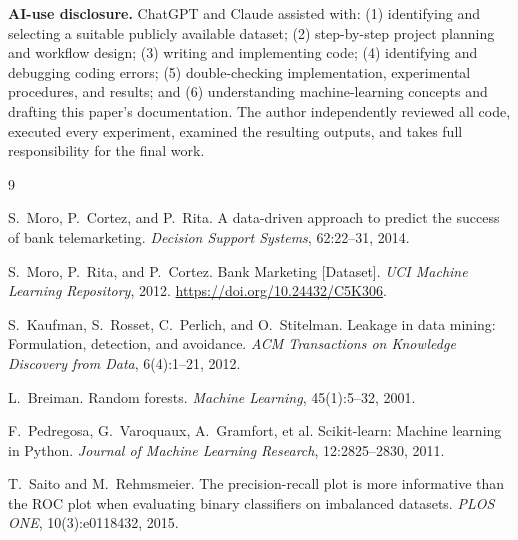 \documentclass{article}
\begin{document}
\textbf{AI-use disclosure.} ChatGPT and Claude assisted with: (1)
identifying and selecting a suitable publicly available dataset; (2)
step-by-step project planning and workflow design; (3) writing and
implementing code; (4) identifying and debugging coding errors; (5)
double-checking implementation, experimental procedures, and results; and
(6) understanding machine-learning concepts and drafting this paper's
documentation. The author independently reviewed all code, executed every
experiment, examined the resulting outputs, and takes full responsibility
for the final work.

\begin{thebibliography}{9}

S.~Moro, P.~Cortez, and P.~Rita.
\newblock A data-driven approach to predict the success of bank telemarketing.
\newblock \emph{Decision Support Systems}, 62:22--31, 2014.

S.~Moro, P.~Rita, and P.~Cortez.
\newblock Bank Marketing [Dataset].
\newblock \emph{UCI Machine Learning Repository}, 2012.
\newblock \url{https://doi.org/10.24432/C5K306}.

S.~Kaufman, S.~Rosset, C.~Perlich, and O.~Stitelman.
\newblock Leakage in data mining: Formulation, detection, and avoidance.
\newblock \emph{ACM Transactions on Knowledge Discovery from Data}, 6(4):1--21, 2012.

L.~Breiman.
\newblock Random forests.
\newblock \emph{Machine Learning}, 45(1):5--32, 2001.

F.~Pedregosa, G.~Varoquaux, A.~Gramfort, et al.
\newblock Scikit-learn: Machine learning in Python.
\newblock \emph{Journal of Machine Learning Research}, 12:2825--2830, 2011.

T.~Saito and M.~Rehmsmeier.
\newblock The precision-recall plot is more informative than the ROC plot
  when evaluating binary classifiers on imbalanced datasets.
\newblock \emph{PLOS ONE}, 10(3):e0118432, 2015.

\end{thebibliography}
\end{document}
